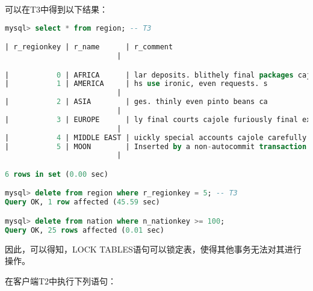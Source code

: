 \documentclass{article}
\begin{document}
可以在T3中得到以下结果：

\begin{lstlisting}[language=sql]
mysql> select * from region; -- T3

| r_regionkey | r_name      | r_comment
                          |

|           0 | AFRICA      | lar deposits. blithely final packages cajole. regular waters are final requests. regular accounts are according to  |
|           1 | AMERICA     | hs use ironic, even requests. s
                          |
|           2 | ASIA        | ges. thinly even pinto beans ca
                          |
|           3 | EUROPE      | ly final courts cajole furiously final excuse
                          |
|           4 | MIDDLE EAST | uickly special accounts cajole carefully blithely close requests. carefully final asymptotes haggle furiousl        |
|           5 | MOON        | Inserted by a non-autocommit transaction.
                          |

6 rows in set (0.00 sec)

mysql> delete from region where r_regionkey = 5; -- T3
Query OK, 1 row affected (45.59 sec)

mysql> delete from nation where n_nationkey >= 100;
Query OK, 25 rows affected (0.01 sec)
\end{lstlisting}

因此，可以得知，LOCK TABLES语句可以锁定表，使得其他事务无法对其进行操作。

在客户端T2中执行下列语句：
\end{document}
